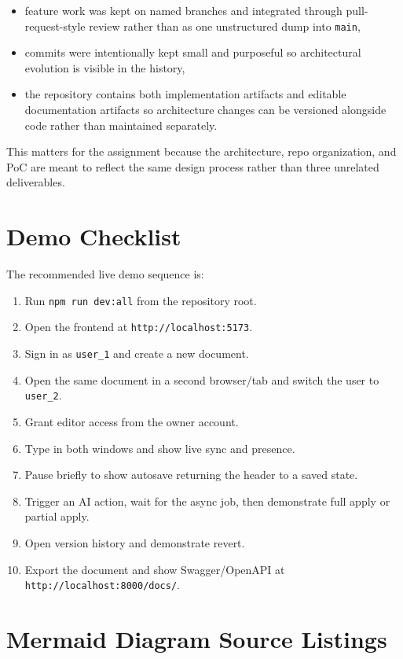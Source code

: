 \begin{itemize}
  \item feature work was kept on named branches and integrated through pull-request-style review rather
  than as one unstructured dump into \texttt{main},
  \item commits were intentionally kept small and purposeful so architectural evolution is visible in the
  history,
  \item the repository contains both implementation artifacts and editable documentation artifacts so
  architecture changes can be versioned alongside code rather than maintained separately.
\end{itemize}

This matters for the assignment because the architecture, repo organization, and PoC are meant to reflect
the same design process rather than three unrelated deliverables.

\section{Demo Checklist}

The recommended live demo sequence is:

\begin{enumerate}
  \item Run \texttt{npm run dev:all} from the repository root.
  \item Open the frontend at \texttt{http://localhost:5173}.
  \item Sign in as \texttt{user\_1} and create a new document.
  \item Open the same document in a second browser/tab and switch the user to \texttt{user\_2}.
  \item Grant editor access from the owner account.
  \item Type in both windows and show live sync and presence.
  \item Pause briefly to show autosave returning the header to a saved state.
  \item Trigger an AI action, wait for the async job, then demonstrate full apply or partial apply.
  \item Open version history and demonstrate revert.
  \item Export the document and show Swagger/OpenAPI at \texttt{http://localhost:8000/docs/}.
\end{enumerate}

\section{Mermaid Diagram Source Listings}

